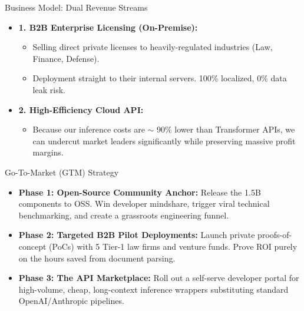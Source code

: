 \documentclass[aspectratio=169, 10pt]{beamer}
\begin{document}
\begin{frame}{Business Model: Dual Revenue Streams}
\begin{itemize}
    \item \textbf{1. B2B Enterprise Licensing (On-Premise):}
    \begin{itemize}
        \item Selling direct private licenses to heavily-regulated industries (Law, Finance, Defense).
        \item Deployment straight to their internal servers. 100\% localized, 0\% data leak risk.
    \end{itemize}
    \item \textbf{2. High-Efficiency Cloud API:}
    \begin{itemize}
        \item Because our inference costs are $\sim$ 90\% lower than Transformer APIs, we can undercut market leaders significantly while preserving massive profit margins.
    \end{itemize}
\end{itemize}
\end{frame}

\begin{frame}{Go-To-Market (GTM) Strategy}
\begin{itemize}
    \item \textbf{Phase 1: Open-Source Community Anchor:} Release the 1.5B components to OSS. Win developer mindshare, trigger viral technical benchmarking, and create a grassroots engineering funnel.
    \item \textbf{Phase 2: Targeted B2B Pilot Deployments:} Launch private proofs-of-concept (PoCs) with 5 Tier-1 law firms and venture funds. Prove ROI purely on the hours saved from document parsing.
    \item \textbf{Phase 3: The API Marketplace:} Roll out a self-serve developer portal for high-volume, cheap, long-context inference wrappers substituting standard OpenAI/Anthropic pipelines.
\end{itemize}
\end{frame}
\end{document}

